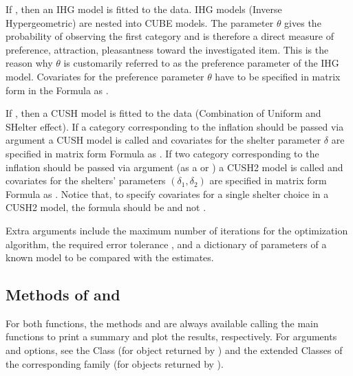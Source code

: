 \documentclass[letterpaper,10pt,english]{sphinxmanual}
\begin{document}
\sphinxAtStartPar
If , then an IHG model is fitted to the data. IHG models (Inverse Hypergeometric) are nested into
CUBE models. The parameter \(\theta\) gives the probability of observing
the first category and is therefore a direct measure of preference, attraction, pleasantness toward the
investigated item. This is the reason why \(\theta\) is customarily referred to as the
preference parameter of the
IHG model. Covariates for the preference parameter \(\theta\) have to be specified
in matrix form in the Formula as .

\sphinxAtStartPar
If , then a CUSH model is fitted to the data (Combination of Uniform and SHelter effect).
If a category corresponding to the inflation should be
passed via argument  a CUSH model is called and
covariates for the shelter parameter \(\delta\)
are specified in matrix form Formula as .
If two category corresponding to the inflation should be
passed via argument  (as a  or ) a CUSH2 model is called and
covariates for the shelters’ parameters \((\delta_1,\delta_2)\)
are specified in matrix form Formula as .
Notice that, to specify covariates for a
single shelter choice in a CUSH2 model,
the formula should be  and not .

\sphinxAtStartPar
Extra arguments include the maximum
number of iterations  for the optimization algorithm,
the required error tolerance , and a dictionary of parameters of a known model
 to be compared with the estimates.


\subsection{Methods of  and }
\label{\detokenize{manual:methods-of-estimate-and-draw}}
\sphinxAtStartPar
For both functions, the methods  and  are always available calling the
main functions to print a summary and plot the results, respectively. For  arguments
and options, see the  Class (for object returned by )
and the extended  Classes of the corresponding
family (for objects returned by ).
\end{document}
